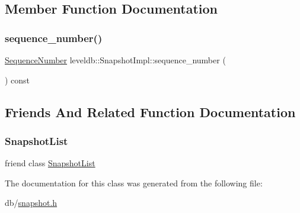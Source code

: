 \subsection{Member Function Documentation}
\mbox{\label{classleveldb_1_1_snapshot_impl_af363ab5b69a424d7ee026f847d808fba}} 
\subsubsection{\texorpdfstring{sequence\_number()}{sequence\_number()}}
{\footnotesize\ttfamily \mbox{\hyperlink{namespaceleveldb_a5481ededd221c36d652c371249f869fa}{Sequence\+Number}} leveldb\+::\+Snapshot\+Impl\+::sequence\+\_\+number (\begin{DoxyParamCaption}{ }\end{DoxyParamCaption}) const\hspace{0.3cm}{\ttfamily [inline]}}



\subsection{Friends And Related Function Documentation}
\mbox{\label{classleveldb_1_1_snapshot_impl_abe14b2fb5e32159324c619e1a42327a0}} 
\subsubsection{\texorpdfstring{SnapshotList}{SnapshotList}}
{\footnotesize\ttfamily friend class \mbox{\hyperlink{classleveldb_1_1_snapshot_list}{Snapshot\+List}}\hspace{0.3cm}{\ttfamily [friend]}}



The documentation for this class was generated from the following file\+:\begin{DoxyCompactItemize}
\item 
db/\mbox{\hyperlink{snapshot_8h}{snapshot.\+h}}\end{DoxyCompactItemize}
